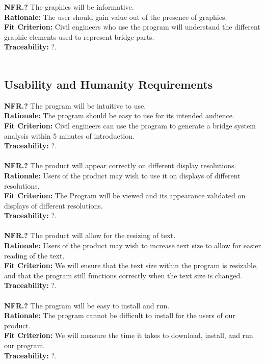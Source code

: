 \documentclass[12pt]{article}
\begin{document}
  \textbf{NFR.?} The graphics will be informative.\\
  \textbf{Rationale:} The user should gain value out of the presence of graphics.\\
  \textbf{Fit Criterion:} Civil engineers who use the program will understand the different graphic elements used to represent bridge parts.\\
  \textbf{Traceability:} ?.\\\\

\subsection{Usability and Humanity Requirements}

  \textbf{NFR.?} The program will be intuitive to use.\\
  \textbf{Rationale:} The program should be easy to use for its intended audience.\\
  \textbf{Fit Criterion:} Civil engineers can use the program to generate a bridge system analysis within 5 minutes of introduction.\\
  \textbf{Traceability:} ?.\\\\

  \noindent\textbf{NFR.?} The product will appear correctly on different display resolutions.\\
  \textbf{Rationale:} Users of the product may wish to use it on displays of different resolutions.\\
  \textbf{Fit Criterion:} The Program will be viewed and its appearance validated on displays of different resolutions.\\
  \textbf{Traceability:} ?.\\\\

  \noindent\textbf{NFR.?} The product will allow for the resizing of text.\\
  \textbf{Rationale:} Users of the product may wish to increase text size to allow for easier reading of the text.\\
  \textbf{Fit Criterion:} We will ensure that the text size within the program is resizable, and that the program still functions correctly when the text size is changed.\\
  \textbf{Traceability:} ?.\\\\

  \noindent\textbf{NFR.?} The program will be easy to install and run.\\
  \textbf{Rationale:} The program cannot be difficult to install for the users of our product.\\
  \textbf{Fit Criterion:} We will measure the time it takes to download, install, and run our program.\\
  \textbf{Traceability:} ?.\\\\
\end{document}
